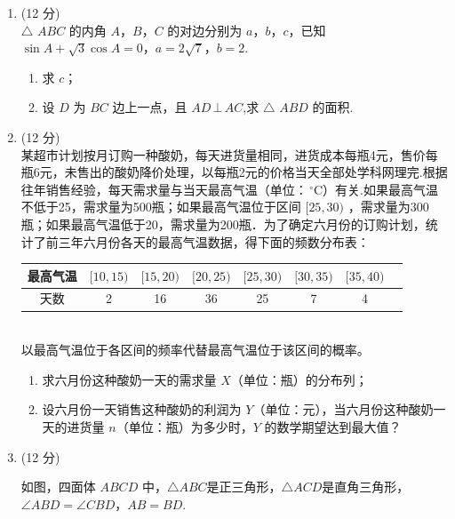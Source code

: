 \documentclass[12pt,space]{ctexart} %
\begin{document}
\begin{enumerate}[itemsep=-0.3em,topsep=0pt,resume]%
\item (12 分)\\
$\triangle$ $ABC$ 的内角 $A$，$B$，$C$ 的对边分别为 $a$，$b$，$c$，已知 $\sin A+\sqrt{3}\cos A=0$，$a=2\sqrt{7}$，$b=2$.
    \begin{enumerate}[itemsep=-0.3em,label={(\arabic*)},topsep=0pt,labelsep=.5em,leftmargin=1.7em]
	\item 求 $c$；
	\item 设 $D$ 为 $BC$ 边上一点，且 $AD\,\bot \,AC$,求 $\triangle$ $ABD$ 的面积.
    \end{enumerate}
\item (12 分)\\
某超市计划按月订购一种酸奶，每天进货量相同，进货成本每瓶4元，售价每瓶6元，未售出的酸奶降价处理，以每瓶2元的价格当天全部处学科网理完.根据往年销售经验，每天需求量与当天最高气温（单位：$\,^{\circ}\mathrm{C}$）有关.如果最高气温不低于25，需求量为500瓶；如果最高气温位于区间 $[25,30)$ ，需求量为300瓶；如果最高气温低于20，需求量为200瓶．为了确定六月份的订购计划，统计了前三年六月份各天的最高气温数据，得下面的频数分布表：\\[-2em]
\begin{table}[htbp]
\centering
\begin{tabular}{|c|c|c|c|c|c|c|c|}\hline
最高气温 & $[10,15)$& $[15,20)$ & $[20,25)$ & $[25,30)$ & $[30,35)$ & $[35,40)$\\\hline
天数     & 2        & 16       &36        &25        &7         &4         \\\hline
\end{tabular}
\end{table}\\[-1em]
以最高气温位于各区间的频率代替最高气温位于该区间的概率。
    \begin{enumerate}[itemsep=-0.3em,label={(\arabic*)},topsep=0pt,labelsep=.5em,leftmargin=1.7em]
	\item 求六月份这种酸奶一天的需求量 $X$（单位：瓶）的分布列；
	\item 设六月份一天销售这种酸奶的利润为 $Y$（单位：元），当六月份这种酸奶一天的进货量 $n$（单位：瓶）为多少时，$Y$ 的数学期望达到最大值？
    \end{enumerate}%
\item (12 分)\\[0.5em] \begin{minipage}[h][20ex][t]{.55\textwidth}
如图，四面体 $ABCD$ 中，$\triangle ABC$是正三角形，$\triangle ACD$是直角三角形，$\angle ABD=\angle CBD$，$AB=BD$.

\end{minipage}
\end{enumerate}
\end{document}

